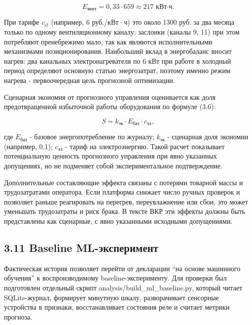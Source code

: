 \documentclass[a4paper,14pt]{extarticle}
\renewcommand{\texttt}[1]{\textnormal{#1}}
\begin{document}
\begin{equation}
E_{\text{вент}} = 0{,}33 \cdot 659 \approx 217 \text{ кВт·ч}.
\tag{3.5}
\end{equation}

При тарифе \(c_{el}\) (например, 6 руб./кВт·ч) это около 1300 руб. за
два месяца только по одному вентиляционному каналу; заслонки (каналы 9,
11) при этом потребляют пренебрежимо мало, так как являются
исполнительными механизмами позиционирования. Наибольший вклад в
энергобаланс вносит нагрев: два канальных электронагревателя по 6 кВт
при работе в холодный период определяют основную статью энергозатрат,
поэтому именно режим нагрева - первоочередная цель прогнозной
оптимизации.

Сценарная экономия от прогнозного управления оценивается как доля
предотвращенной избыточной работы оборудования по формуле (3.6):

\begin{equation}
S = k_{\text{эк}} \cdot E_{\text{баз}} \cdot c_{\text{эл}},
\tag{3.6}
\end{equation}

где \(E_{\text{баз}}\) - базовое энергопотребление по журналу;
\(k_{\text{эк}}\) - сценарная доля экономии (например, 0,1);
\(c_{\text{эл}}\) - тариф на электроэнергию. Такой расчет показывает
потенциальную ценность прогнозного управления при явно указанных
допущениях, но не подменяет собой экспериментальное подтверждение.

Дополнительные составляющие эффекта связаны с потерями товарной массы и
трудозатратами оператора. Если платформа снижает число ручных проверок и
позволяет раньше реагировать на перегрев, переувлажнение или сбои, это
может уменьшать трудозатраты и риск брака. В тексте ВКР эти эффекты
должны быть представлены как сценарные, с явно указанными исходными
допущениями.

\hypertarget{baseline-ml-ux44dux43aux441ux43fux435ux440ux438ux43cux435ux43dux442}{%
\subsection{3.11 Baseline
ML-эксперимент}\label{baseline-ml-ux44dux43aux441ux43fux435ux440ux438ux43cux435ux43dux442}}

Фактическая история позволяет перейти от декларации ``на основе
машинного обучения'' к воспроизводимому baseline-эксперименту. Для
проверки был подготовлен отдельный скрипт
\texttt{analysis/build\_ml\_baseline.py}, который читает SQLite-журнал,
формирует минутную шкалу, разворачивает сенсорные устройства в признаки,
восстанавливает состояния реле и считает метрики прогноза.
\end{document}
